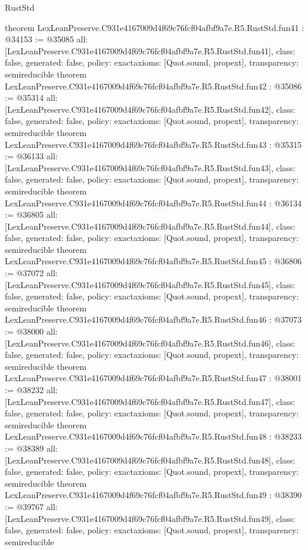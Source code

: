 \begin{lexlean}{RustStd}
\begin{coremodule}
{}
theorem LexLeanPreserve.C931e4167009d4f69c76fcf04afbf9a7e.R5.RustStd.fun41 : @34153 := @35085 {
  all: [LexLeanPreserve.C931e4167009d4f69c76fcf04afbf9a7e.R5.RustStd.fun41],
  class: false,
  generated: false,
  policy: exact{axioms: [Quot.sound, propext]},
  transparency: semireducible
}
theorem LexLeanPreserve.C931e4167009d4f69c76fcf04afbf9a7e.R5.RustStd.fun42 : @35086 := @35314 {
  all: [LexLeanPreserve.C931e4167009d4f69c76fcf04afbf9a7e.R5.RustStd.fun42],
  class: false,
  generated: false,
  policy: exact{axioms: [Quot.sound, propext]},
  transparency: semireducible
}
theorem LexLeanPreserve.C931e4167009d4f69c76fcf04afbf9a7e.R5.RustStd.fun43 : @35315 := @36133 {
  all: [LexLeanPreserve.C931e4167009d4f69c76fcf04afbf9a7e.R5.RustStd.fun43],
  class: false,
  generated: false,
  policy: exact{axioms: [Quot.sound, propext]},
  transparency: semireducible
}
theorem LexLeanPreserve.C931e4167009d4f69c76fcf04afbf9a7e.R5.RustStd.fun44 : @36134 := @36805 {
  all: [LexLeanPreserve.C931e4167009d4f69c76fcf04afbf9a7e.R5.RustStd.fun44],
  class: false,
  generated: false,
  policy: exact{axioms: [Quot.sound, propext]},
  transparency: semireducible
}
theorem LexLeanPreserve.C931e4167009d4f69c76fcf04afbf9a7e.R5.RustStd.fun45 : @36806 := @37072 {
  all: [LexLeanPreserve.C931e4167009d4f69c76fcf04afbf9a7e.R5.RustStd.fun45],
  class: false,
  generated: false,
  policy: exact{axioms: [Quot.sound, propext]},
  transparency: semireducible
}
theorem LexLeanPreserve.C931e4167009d4f69c76fcf04afbf9a7e.R5.RustStd.fun46 : @37073 := @38000 {
  all: [LexLeanPreserve.C931e4167009d4f69c76fcf04afbf9a7e.R5.RustStd.fun46],
  class: false,
  generated: false,
  policy: exact{axioms: [Quot.sound, propext]},
  transparency: semireducible
}
theorem LexLeanPreserve.C931e4167009d4f69c76fcf04afbf9a7e.R5.RustStd.fun47 : @38001 := @38232 {
  all: [LexLeanPreserve.C931e4167009d4f69c76fcf04afbf9a7e.R5.RustStd.fun47],
  class: false,
  generated: false,
  policy: exact{axioms: [Quot.sound, propext]},
  transparency: semireducible
}
theorem LexLeanPreserve.C931e4167009d4f69c76fcf04afbf9a7e.R5.RustStd.fun48 : @38233 := @38389 {
  all: [LexLeanPreserve.C931e4167009d4f69c76fcf04afbf9a7e.R5.RustStd.fun48],
  class: false,
  generated: false,
  policy: exact{axioms: [Quot.sound, propext]},
  transparency: semireducible
}
theorem LexLeanPreserve.C931e4167009d4f69c76fcf04afbf9a7e.R5.RustStd.fun49 : @38390 := @39767 {
  all: [LexLeanPreserve.C931e4167009d4f69c76fcf04afbf9a7e.R5.RustStd.fun49],
  class: false,
  generated: false,
  policy: exact{axioms: [Quot.sound, propext]},
  transparency: semireducible
}
\end{coremodule}
\end{lexlean}
